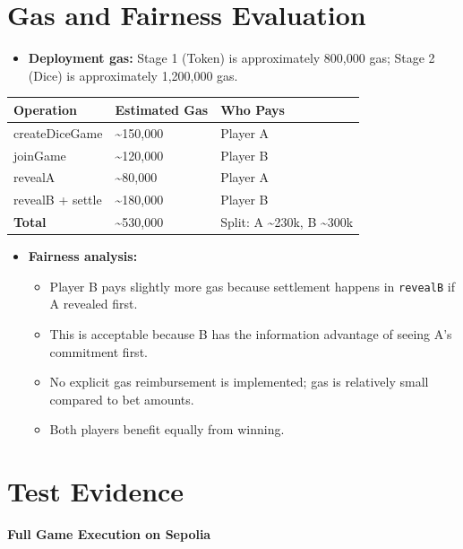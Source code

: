 \documentclass[10pt,a4paper]{article}
\begin{document}
\section{Gas and Fairness Evaluation}
\begin{itemize}
  \item \textbf{Deployment gas:} Stage 1 (Token) is approximately 800,000 gas; Stage 2 (Dice) is approximately 1,200,000 gas.
\end{itemize}

\begin{tabularx}{\textwidth}{@{}>{\raggedright\arraybackslash}p{}>{\raggedright\arraybackslash}p{}X@{}}
\toprule
\textbf{Operation} & \textbf{Estimated Gas} & \textbf{Who Pays} \\
\midrule
createDiceGame & \textasciitilde 150,000 & Player A \\
joinGame & \textasciitilde 120,000 & Player B \\
revealA & \textasciitilde 80,000 & Player A \\
revealB + settle & \textasciitilde 180,000 & Player B \\
\textbf{Total} & \textasciitilde 530,000 & Split: A \textasciitilde 230k, B \textasciitilde 300k \\
\bottomrule
\end{tabularx}

\begin{itemize}
  \item \textbf{Fairness analysis:}
  \begin{itemize}
    \item Player B pays slightly more gas because settlement happens in \texttt{revealB} if A revealed first.
    \item This is acceptable because B has the information advantage of seeing A's commitment first.
    \item No explicit gas reimbursement is implemented; gas is relatively small compared to bet amounts.
    \item Both players benefit equally from winning.
  \end{itemize}
\end{itemize}

\section{Test Evidence}
\begingroup
\small
\textbf{Full Game Execution on Sepolia}
\end{document}
